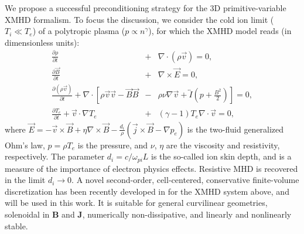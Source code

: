 \documentclass{report}
\begin{document}
We propose a successful preconditioning strategy for the 3D primitive-variable
XMHD formalism. To focus the discussion, we consider the cold ion
limit ($T_{i}\ll T_{e}$) of a polytropic plasma ($p\propto n^{\gamma }$),
for which the XMHD model reads (in dimensionless units):\begin{eqnarray*}
\frac{\partial \rho }{\partial t} & + & \nabla \cdot (\rho \vec{v})=0,\\
\frac{\partial \vec{B}}{\partial t} & + & \nabla \times \vec{E}=0,\\
\frac{\partial (\rho \vec{v})}{\partial t}+\nabla \cdot \left[\rho
\vec{v}\vec{v}-\vec{B}\vec{B}\right. & - & \left.\rho \nu \nabla
\vec{v}+\overleftrightarrow{I}(p+\frac{B^{2}}{2})\right]=0,\\
\frac{\partial T_{e}}{\partial t}+\vec{v}\cdot \nabla T_{e} & + & (\gamma
-1)T_{e}\nabla \cdot \vec{v}=0,
\end{eqnarray*}
where $\vec{E}=-\vec{v}\times \vec{B}+\eta \nabla \times
\vec{B}-\frac{d_{i}}{\rho }(\vec{j}\times \vec{B}-\nabla p_{e})$
is the two-fluid generalized Ohm's law, $p=\rho T_{e}$ is the pressure,
and $\nu $, $\eta $ are the viscosity and resistivity, respectively.
The parameter $d_{i}=c/\omega _{pi}L$ is the so-called ion skin depth,
and is a measure of the importance of electron physics effects. Resistive
MHD is recovered in the limit $d_{i}\rightarrow 0$. A novel second-order,
cell-centered, conservative finite-volume discretization has been
recently developed in \cite{chacon-cpc-04} for the XMHD system above,
and will be used in this work. It is suitable for general curvilinear
geometries, solenoidal in $\mathbf{B}$ and $\mathbf{J}$, numerically
non-dissipative, and linearly and nonlinearly stable.
\end{document}
